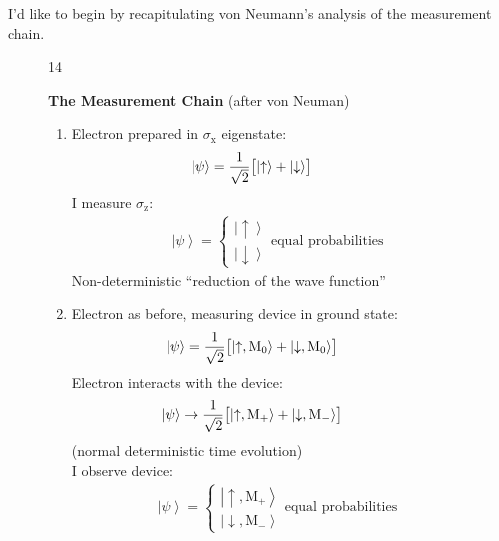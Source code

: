 \documentclass[twocolumn,prb]{revtex4}
\newcommand{\ket}[1]{\left|#1\right\rangle}
\newcommand{\x}{\text{x}}
\newcommand{\z}{\text{z}}
\newcommand{\M}{\text{M}}
\newcommand{\up}{\uparrow}
\newcommand{\dw}{\downarrow}
\begin{document}
I'd like to begin by recapitulating von Neumann's analysis of the measurement chain.

\begin{figure}[htb] 
\begin{mdframed}
  \vspace{5pt}\hfill 14\\[-18pt]
  \begin{center}
    \textbf{The Measurement Chain} (after von Neuman)
  \end{center}
  \begin{raggedright}
  \begin{enumerate}[label={(\arabic*)}]\setcounter{enumi}{0}
    \item Electron prepared in $\sigma_\x$ eigenstate:
      \begin{align}\nonumber
        &\hspace{-20pt}
          \ket{\psi}=\frac{1}{\sqrt{2}}
          \bigl[\ket{\up} + \ket{\dw}\bigr]
      \end{align}
      I measure $\sigma_\z$:
      \begin{align}\nonumber
        &%
          \ket{\psi}=
          \begin{cases}
            \ket{\up} \\[3pt] \ket{\dw}
          \end{cases}
        \text{equal probabilities}
      \end{align}
      Non-deterministic ``reduction of the wave function''
    \item Electron as before, measuring device in ground state:
      \begin{align}\nonumber
        &\hspace{-20pt}
          \ket{\psi}=\frac{1}{\sqrt{2}}
          \bigl[\ket{\up,\M_0} + \ket{\dw,\M_0}\bigr]
      \end{align}
      Electron interacts with the device:
      \begin{align}\nonumber
        &\hspace{-20pt}
          \ket{\psi}\rightarrow\frac{1}{\sqrt{2}}
          \bigl[\ket{\up,\M_+} + \ket{\dw,\M_-}\bigr]
      \end{align}
      (normal deterministic time evolution)\\[5pt]
      I observe device:
      \begin{align}\nonumber
        &%
          \ket{\psi}=
          \begin{cases}
            \ket{\up,\M_+} \\[3pt] \ket{\dw,\M_-}
          \end{cases}
        \text{equal probabilities}
      \end{align}
  \end{enumerate}
  \end{raggedright}
\vspace{-.5\baselineskip}
\end{mdframed}
\end{figure}
\end{document}
